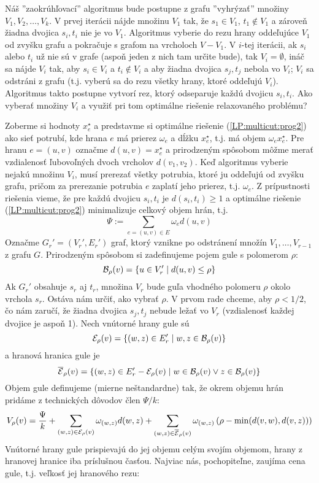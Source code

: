 \noindent
Náš ''zaokrúhľovací'' algoritmus 
bude postupne z grafu ''vyhrýzať'' množiny $V_1,V_2,\ldots,V_k$. V prvej iterácii nájde množinu $V_1$ tak,
že $s_1\in V_1$, $t_1\not\in V_1$ a zároveň žiadna dvojica $s_i, t_i$ nie je vo $V_1$. Algoritmus vyberie
do rezu hrany oddeľujúce $V_1$ od zvyšku grafu a pokračuje s grafom na vrcholoch $V-V_1$. V $i$-tej iterácii,
ak $s_i$ alebo $t_i$ už nie sú v grafe (aspoň jeden z nich tam určite bude), tak $V_i=\emptyset$, ináč
sa nájde $V_i$ tak, aby $s_i\in V_i$ a $t_i\not\in V_i$ a aby žiadna dvojica $s_j,t_j$ nebola vo $V_i$;
$V_i$ sa odstráni z grafu (t.j. vyberú sa do rezu všetky hrany, ktoré oddeľujú $V_i$).  
Algoritmus takto postupne vytvorí rez, ktorý odseparuje každú dvojicu $s_i, t_i$. 
Ako vyberať množiny $V_i$ a využiť pri tom optimálne riešenie relaxovaného problému?


\noindent
Zoberme si hodnoty $x_e^\star$ a predstavme si optimálne riešenie (\ref{LP:multicut:prog2})  ako sieť potrubí, 
kde hrana $e$ má prierez $\omega_e$ a
dĺžku $x_e^\star$, t.j. má objem $\omega_ex_e^\star$. Pre hranu $e=(u,v)$ označme $d(u,v)=x_e^\star$ a 
prirodzeným spôsobom môžme merať vzdialenosť ľubovoľných dvoch vrcholov $d(v_1,v_2)$. 
Keď algoritmus vyberie nejakú množinu $V_i$, musí prerezať všetky potrubia, ktoré ju oddeľujú od zvyšku grafu,
pričom za prerezanie potrubia $e$ zaplatí jeho prierez, t.j. $\omega_e$.
Z prípustnosti riešenia vieme, že pre každú dvojicu $s_i,t_i$ je $d(s_i,t_i)\ge1$ a 
optimálne riešenie  (\ref{LP:multicut:prog2})  minimalizuje
celkový objem hrán, t.j. 
$$\Psi:=\sum_{e=(u,v)\in E}\omega_ed(u,v)$$
Označme $G_r'=(V_r',E_r')$ graf, ktorý vznikne po odstránení množín 
$V_1,\ldots,V_{r-1}$ z grafu $G$. Prirodzeným spôsobom si zadefinujeme pojem gule s polomerom $\rho$:
$${\cal B}_\rho(v)=\{u\in V_r'\mid d(u,v)\le\rho\}$$
Ak $G_r'$ obsahuje $s_r$ aj $t_r$, 
množina $V_r$ bude guľa vhodného polomeru $\rho$ okolo vrchola $s_r$. Ostáva nám určiť, ako vybrať $\rho$. V prvom rade
chceme, aby $\rho<1/2$, čo nám zaručí, že žiadna dvojica $s_j,t_j$ 
nebude ležať vo $V_r$ (vzdialenosť každej dvojice je aspoň 1).
Nech vnútorné hrany gule sú
$${\cal E}_\rho(v)=\{(w,z)\in E_r'\mid w,z\in{\cal B}_\rho(v)\}$$
a hranová hranica gule je
$$\overline{\cal E}_\rho(v)=\{(w,z)\in E_r'-{\cal E}_\rho(v)\mid w\in{\cal B}_\rho(v)\vee z\in{\cal B}_\rho(v)\}$$
Objem gule definujeme (mierne neštandardne) tak, že okrem objemu hrán pridáme z technických dôvodov člen $\Psi/k$:
$$V_\rho(v)=\frac{\Psi}{k}+\sum_{(w,z)\in{\cal E}_\rho(v)}\omega_{(w,z)}d(w,z)+
\sum_{(w,z)\in\overline{\cal E}_\rho(v)}\omega_{(w,z)}\left(\rho-\min(d(v,w),d(v,z))\right)$$
Vnútorné hrany gule prispievajú do jej objemu celým svojím objemom, hrany z hranovej hranice iba príslušnou časťou.
Najviac nás, pochopiteľne, zaujíma cena gule, t.j. veľkosť jej hranového rezu:

